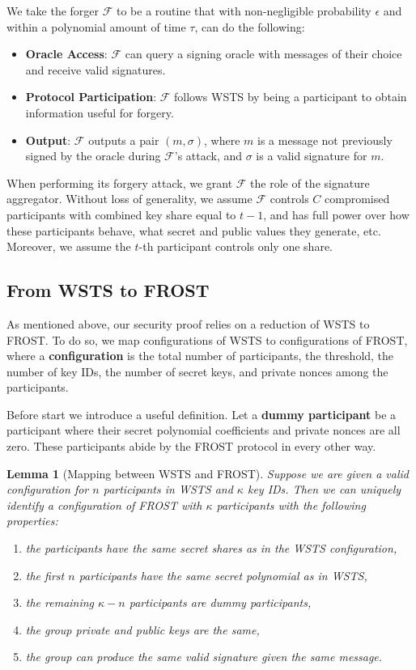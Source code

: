 \documentclass{article}
\newtheorem{lem}[thm]{Lemma}
\theoremstyle{definition}
\theoremstyle{remark}
\begin{document}
We take the forger $\mathcal{F}$ to be a routine that with non-negligible probability $\epsilon$ and within a polynomial amount of time $\tau$, can do the following:
\begin{itemize}
    \item \textbf{Oracle Access}: \( \mathcal{F} \) can query a signing oracle with messages of their choice and receive valid signatures.
    \item \textbf{Protocol Participation}: \( \mathcal{F} \) follows WSTS by being a participant to obtain information useful for forgery.
    \item \textbf{Output}: \( \mathcal{F} \) outputs a pair \((m, \sigma)\), where \(m\) is a message not previously signed by the oracle during \( \mathcal{F} \)'s attack, and \(\sigma\) is a valid signature for \(m\).
\end{itemize}

When performing its forgery attack, we grant $\mathcal{F}$ the role of the signature aggregator. Without loss of generality, we assume $\mathcal{F}$ controls $C$ compromised participants with combined key share equal to $t-1$, and has full power over how these participants behave, what secret and public values they generate, etc. Moreover, we assume the $t$-th participant controls only one share.

\subsection{From WSTS to FROST}

As mentioned above, our security proof relies on a reduction of WSTS to FROST. To do so, we map configurations of WSTS to configurations of FROST, where a \textbf{configuration} is the total number of participants, the threshold, the number of key IDs, the number of secret keys, and private nonces among the participants.

Before start we introduce a useful definition. Let a \textbf{dummy participant} be a participant where their secret polynomial coefficients and private nonces are all zero. These participants abide by the FROST protocol in every other way.

\begin{lem}[Mapping between WSTS and FROST]\label{lemma:wsts-frost-equivalence}
    Suppose we are given a valid configuration for $n$ participants in WSTS and $\kappa$ key IDs. Then we can uniquely identify a configuration of FROST with $\kappa$ participants with the following properties:
    \begin{enumerate}
        \item the participants have the same secret shares as in the WSTS configuration,
        \item the first $n$ participants have the same secret polynomial as in WSTS,
        \item the remaining $\kappa - n$ participants are dummy participants,
        \item the group private and public keys are the same,
        \item the group can produce the same valid signature given the same message.
    \end{enumerate}
\end{lem}
\end{document}
